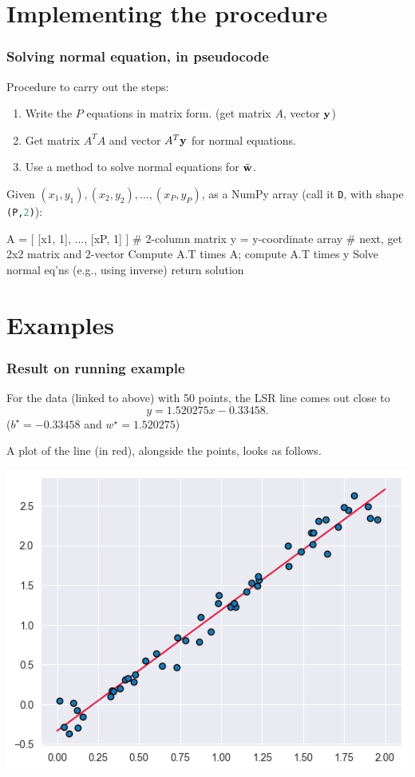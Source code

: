 \documentclass{beamer}
\theoremstyle{example}
\newcommand{\ct}[1]{\lstinline[language=Python,basicstyle=\ttfamily\footnotesize,stringstyle=\small\color{strings}]!#1!}
\begin{document}
\section{Implementing the procedure}

\begin{frame}[fragile]
\frametitle{Solving normal equation, in pseudocode}
Procedure to carry out the steps:
\begin{enumerate}
    \item Write the $P$ equations in matrix form. (get matrix $A$, vector ${\bf y}$)
    \item Get matrix $A^TA$ and vector $A^T{\bf y}$ for normal equations.
    \item Use a method to solve normal equations for $\tilde{\bf w}$.
\end{enumerate}

\pause
\vspace*{12pt}
Given $(x_1,y_1), (x_2,y_2), \ldots, (x_P, y_P)$, as a NumPy array (call it \ct{D}, with shape \ct{(P,2)}): 

\begin{pseudo}
A = [ [x1, 1], ..., [xP, 1] ] # 2-column matrix
y = y-coordinate array
# next, get 2x2 matrix and 2-vector
Compute A.T times A; compute A.T times y
Solve normal eq'ns (e.g., using inverse)
return solution 
\end{pseudo}

\end{frame}

\section{Examples}

\begin{frame}
\frametitle{Result on running example}
For the data (linked to above) with 50 points, the LSR line comes out close to
    \[y = 1.520275x - 0.33458.\]
($b^\star = -0.33458$ and $w^\star = 1.520275$)

\pause
A plot of the line (in red), alongside the points, looks as follows.

\vspace*{8pt}
\centering
\includegraphics[height=0.4\textheight]{example1-lsrline.png}
\end{frame}
\end{document}
